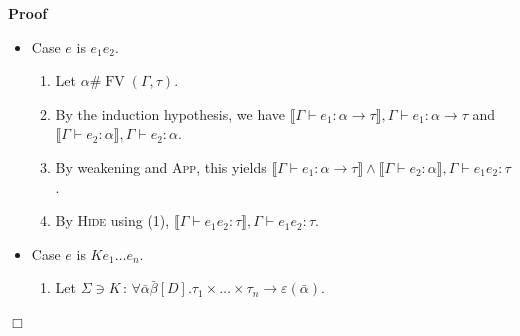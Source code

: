 \documentclass{article}
\newcommand{\colons}{\,:\,}
\newcommand{\tmname}[1]{\textsc{#1}}
\newcommand{\tmop}[1]{\ensuremath{\operatorname{#1}}}
\newenvironment{proof}{\noindent\textbf{Proof\ }}{\hspace*{\fill}$\Box$\medskip}
\begin{document}
\begin{proof}
\begin{itemize}
\begin{enumerate}
      \item Induction hypothesis yelds $\llbracket \Gamma \vdash c_i :
      \alpha_1 \rightarrow \alpha_2 \rrbracket, \Gamma \vdash c_i : \alpha_1
      \rightarrow \alpha_2$.
      
      \item By (2), weakening and {\tmname{Abs}}, $\llbracket \Gamma \vdash
      \bar{c} : \alpha_1 \rightarrow \alpha_2 \rrbracket, \Gamma \vdash
      \lambda \bar{c} : \alpha_1 \rightarrow \alpha_2$.
      
      \item By weakening and {\tmname{Equ}}, (3) implies $\llbracket \Gamma
      \vdash \bar{c} : \alpha_1 \rightarrow \alpha_2 \rrbracket \wedge
      \alpha_1 \rightarrow \alpha_2 \dot{=} \tau, \Gamma \vdash \lambda
      \bar{c} : \tau$.
      
      \item By (1) and {\tmname{Hide}}, this implies $\llbracket \Gamma \vdash
      \lambda \bar{c} : \tau \rrbracket, \Gamma \vdash \lambda \bar{c} :
      \tau$.
    \end{enumerate}
    \item Case $e$ is $e_1 e_2$.
    \begin{enumerate}
      \item Let $\alpha \# \tmop{FV} (\Gamma, \tau)$.
      
      \item By the induction hypothesis, we have $\llbracket \Gamma \vdash e_1
      : \alpha \rightarrow \tau \rrbracket, \Gamma \vdash e_1 : \alpha
      \rightarrow \tau$ and $\llbracket \Gamma \vdash e_2 : \alpha \rrbracket,
      \Gamma \vdash e_2 : \alpha$.
      
      \item By weakening and {\tmname{App}}, this yields $\llbracket \Gamma
      \vdash e_1 : \alpha \rightarrow \tau \rrbracket \wedge \llbracket \Gamma
      \vdash e_2 : \alpha \rrbracket, \Gamma \vdash e_1 e_2 : \tau$.
      
      \item By {\tmname{Hide}} using (1), $\llbracket \Gamma \vdash e_1 e_2 :
      \tau \rrbracket, \Gamma \vdash e_1 e_2 : \tau$.
    \end{enumerate}
    \item Case $e$ is $Ke_1 \ldots e_n$.
    \begin{enumerate}
      \item Let $\Sigma \ni K \colons \forall \bar{\alpha} \bar{\beta} [D] .
      \tau_1 \times \ldots \times \tau_n \rightarrow \varepsilon
      (\bar{\alpha})$.
      

\end{enumerate}
\end{itemize}
\end{proof}
\end{document}

